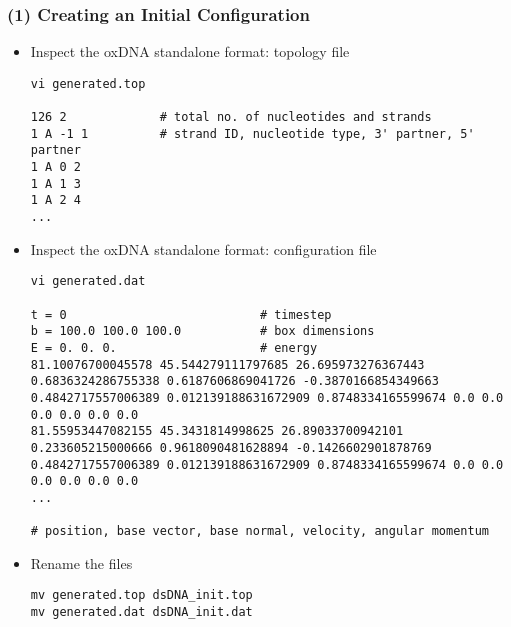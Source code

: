 \documentclass[slidestop,compress,9pt]{beamer}
\begin{document}
\begin{frame}[fragile]
\frametitle{(1) Creating an Initial Configuration}
\small

\begin{itemize}
\item Inspect the oxDNA standalone format: topology file
\linespread{0.4}
\begin{lstlisting}
vi generated.top

126 2             # total no. of nucleotides and strands
1 A -1 1          # strand ID, nucleotide type, 3' partner, 5' partner
1 A 0 2
1 A 1 3
1 A 2 4
...
\end{lstlisting}


\item Inspect the oxDNA standalone format: configuration file
\begin{lstlisting}
vi generated.dat

t = 0                           # timestep
b = 100.0 100.0 100.0           # box dimensions
E = 0. 0. 0.                    # energy 
81.10076700045578 45.544279111797685 26.695973276367443 0.6836324286755338 0.6187606869041726 -0.3870166854349663 0.4842717557006389 0.012139188631672909 0.8748334165599674 0.0 0.0 0.0 0.0 0.0 0.0
81.55953447082155 45.3431814998625 26.89033700942101 0.233605215000666 0.9618090481628894 -0.1426602901878769 0.4842717557006389 0.012139188631672909 0.8748334165599674 0.0 0.0 0.0 0.0 0.0 0.0
...

# position, base vector, base normal, velocity, angular momentum
\end{lstlisting}

\item Rename the files
\begin{lstlisting}
mv generated.top dsDNA_init.top
mv generated.dat dsDNA_init.dat
\end{lstlisting}

\end{itemize}

\end{frame}
\end{document}

